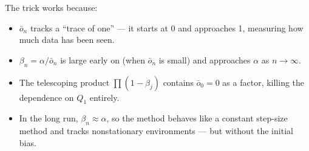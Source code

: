 \documentclass[11pt]{article}
\begin{document}
The trick works because:
\begin{itemize}
    \item $\bar{o}_n$ tracks a ``trace of one'' --- it starts at 0 and approaches 1,
          measuring how much data has been seen.
    \item $\beta_n = \alpha/\bar{o}_n$ is large early on (when $\bar{o}_n$ is small)
          and approaches $\alpha$ as $n \to \infty$.
    \item The telescoping product $\prod(1-\beta_j)$ contains $\bar{o}_0 = 0$ as a factor,
          killing the dependence on $Q_1$ entirely.
    \item In the long run, $\beta_n \approx \alpha$, so the method behaves like a constant
          step-size method and tracks nonstationary environments --- but without the
          initial bias.
\end{itemize}
\end{document}
